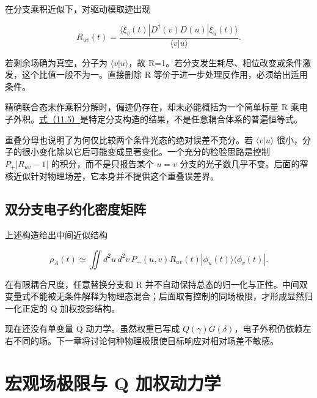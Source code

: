 \documentclass[UTF8,a4paper,zihao=-4,openany,fontset=fandol]{ctexbook}
\begin{document}
在分支乘积近似下，对驱动模取迹出现



\begin{equation*}
R_{uv}(t)=\frac{\langle\xi_v(t)|D^\dagger(v)D(u)|\xi_u(t)\rangle}
{\langle v|u\rangle}.
\tag{11.5}\label{eq:11.5}
\end{equation*}


若剩余场确为真空，分子为 $\langle v|u\rangle$，故 R=1。若分支发生耗尽、相位改变或条件激发，这个比值一般不为一。直接删除 R 等价于进一步处理反作用，必须给出适用条件。



精确联合态未作乘积分解时，偏迹仍存在，却未必能概括为一个简单标量 R 乘电子外积。\hyperref[eq:11.5]{式（11.5）}是特定分支构造的结果，不是任意耦合体系的普遍恒等式。



重叠分母也说明了为何仅比较两个条件光态的绝对误差不充分。若 $\langle v|u\rangle$ 很小，分子的很小变化除以它后可能变成显著变化。一个充分的检验思路是控制 $P_+|R_{uv}-1|$ 的积分，而不是只报告某个 $u=v$ 分支的光子数几乎不变。后面的窄核近似针对物理场差，它本身并不提供这个重叠误差界。



\section{双分支电子约化密度矩阵}\label{sec:11:9}


上述构造给出中间近似结构



\begin{equation*}
\rho_A(t)\simeq\iint d^2u\,d^2v\,
P_+(u,v)R_{uv}(t)|\phi_u(t)\rangle\langle\phi_v(t)|.
\tag{11.6}\label{eq:11.6}
\end{equation*}


在有限耦合尺度，任意替换分支和 R 并不自动保持总态的归一化与正性。中间双变量式不能被无条件解释为物理态混合；后面取有控制的同场极限，才形成显然归一化正定的 Q 加权投影结构。



现在还没有单变量 Q 动力学。虽然权重已写成 $Q(\gamma)G(\delta)$，电子外积仍依赖左右不同的场。下一章将讨论何种物理极限使目标响应对相对场差不敏感。



\chapter{宏观场极限与 Q 加权动力学}\label{ch:12}
\end{document}
